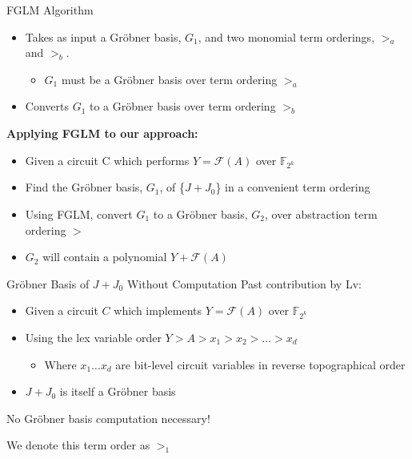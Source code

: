 \documentclass[xcolor=dvipsnames]{beamer}
\newcommand{\Fkk}{{\mathbb{F}}_{2^k}}
\newcommand{\Grobner}{Gr\"{o}bner\xspace}
\newcommand{\F}{{\mathcal{F}}}
\begin{document}
\begin{frame}{\large {FGLM Algorithm}}
\vspace{-0.2in}

\begin{itemize}
\item Takes as input a \Grobner basis, $G_1$, and two monomial term orderings, $>_a$ and $>_b$.
	\begin{itemize}
	\item $G_1$ must be a \Grobner basis over term ordering $>_a$
	\end{itemize}
\end{itemize}

\begin{itemize}
\item Converts $G_1$ to a \Grobner basis over term ordering $>_b$
\end{itemize}

{\bf Applying FGLM to our approach:}
\begin{itemize}
	\item Given a circuit C which performs $Y = \F(A)$ over $\Fkk$
	\item Find the \Grobner basis, $G_1$, of \{$J+J_0$\} in a convenient term ordering
	\item Using FGLM, convert $G_1$ to a \Grobner basis, $G_2$, over abstraction term ordering $>$
	\item $G_2$ will contain a polynomial $Y + \F(A)$
\end{itemize}


\end{frame}


\begin{frame}{\large{\Grobner Basis of $J + J_0$ Without Computation}}
Past contribution by Lv:

\begin{itemize}
\item Given a circuit $C$ which implements $Y = \F(A)$ over $\Fkk$
\end{itemize}
\begin{itemize}
\item Using the lex variable order $Y > A > x_1 > x_2 > \dots > x_d$
	\begin{itemize}
	\item Where $x_1 \dots x_d$ are bit-level circuit variables in \alert{reverse topographical order}
	\end{itemize}
\end{itemize}
\begin{itemize}
\item $J + J_0$ is itself a \Grobner basis
\end{itemize}

No \Grobner basis computation necessary!

We denote this term order as $>_1$
\end{frame}
\end{document}

